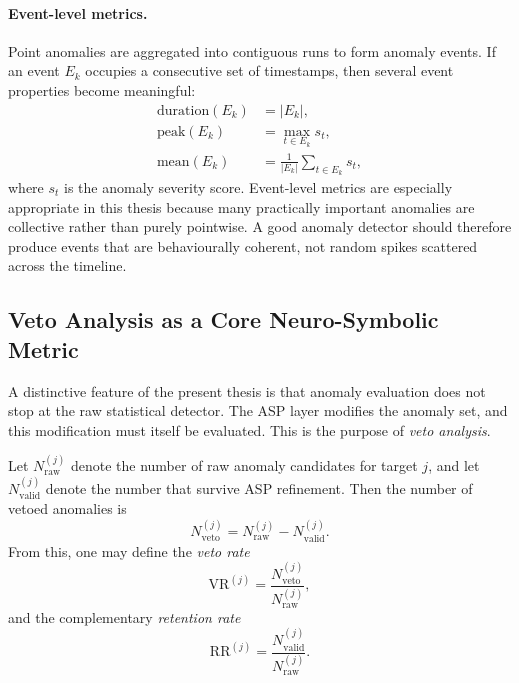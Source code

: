 \paragraph{Event-level metrics.}
Point anomalies are aggregated into contiguous runs to form anomaly events. If an event $E_k$ occupies a consecutive set of timestamps, then several event properties become meaningful:
\begin{align}
	\mathrm{duration}(E_k) &= |E_k|, \\
	\mathrm{peak}(E_k) &= \max_{t \in E_k} s_t, \\
	\mathrm{mean}(E_k) &= \frac{1}{|E_k|}\sum_{t \in E_k} s_t,
\end{align}
where $s_t$ is the anomaly severity score. Event-level metrics are especially appropriate in this thesis because many practically important anomalies are collective rather than purely pointwise. A good anomaly detector should therefore produce events that are behaviourally coherent, not random spikes scattered across the timeline.

\subsection{Veto Analysis as a Core Neuro-Symbolic Metric}

A distinctive feature of the present thesis is that anomaly evaluation does not stop at the raw statistical detector. The ASP layer modifies the anomaly set, and this modification must itself be evaluated. This is the purpose of \emph{veto analysis}.

Let $N_{\mathrm{raw}}^{(j)}$ denote the number of raw anomaly candidates for target $j$, and let $N_{\mathrm{valid}}^{(j)}$ denote the number that survive ASP refinement. Then the number of vetoed anomalies is
\begin{equation}
	N_{\mathrm{veto}}^{(j)} =
	N_{\mathrm{raw}}^{(j)} - N_{\mathrm{valid}}^{(j)}.
	\label{eq:veto_count}
\end{equation}
From this, one may define the \emph{veto rate}
\begin{equation}
	\mathrm{VR}^{(j)} =
	\frac{N_{\mathrm{veto}}^{(j)}}{N_{\mathrm{raw}}^{(j)}},
	\label{eq:veto_rate}
\end{equation}
and the complementary \emph{retention rate}
\begin{equation}
	\mathrm{RR}^{(j)} =
	\frac{N_{\mathrm{valid}}^{(j)}}{N_{\mathrm{raw}}^{(j)}}.
	\label{eq:retention_rate}
\end{equation}

